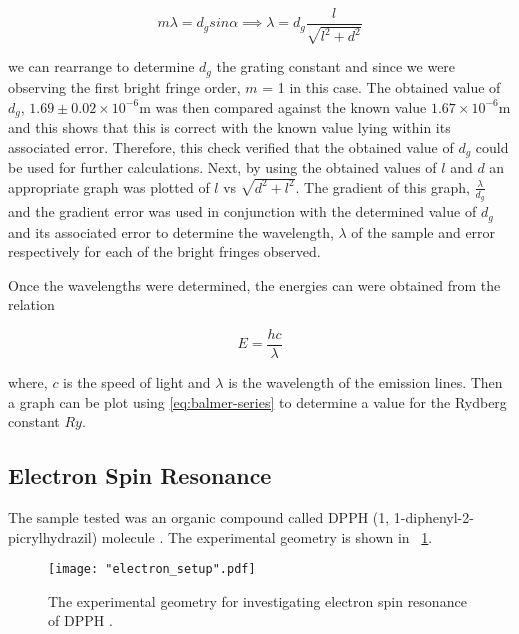 \documentclass{article}
\newcommand{\figref}[2][\figurename~]{#1\ref{#2}}
\begin{document}
\begin{equation}
\label{eq:grating-equation}
m\lambda = d_gsin\alpha \implies \lambda = d_g\frac{l}{\sqrt{l^2+d^2}}
\end{equation}

\vspace{2mm}
\noindent
we can rearrange to determine $d_g$ the grating constant and since we were observing the first bright fringe order, $m$ = 1 in this case. The obtained value of $d_g$, $1.69 \pm 0.02 \times 10^{-6}$m was then compared against the known value $1.67 \times 10 ^{-6}$m \cite{Paper01} and this shows that this is correct with the known value lying within its associated error. Therefore, this check verified that the obtained value of $d_g$ could be used for further calculations. Next, by using the obtained values of $l$ and $d$ an appropriate graph was plotted of $l$ vs $\sqrt{d^2 + l^2}$. The gradient of this graph, $\frac{\lambda}{d_g}$ and the gradient error was used in conjunction with the determined value of $d_g$ and its associated error to determine the wavelength, $\lambda$ of the sample and error respectively for each of the bright fringes observed.

\vspace{2mm}
\noindent
Once the wavelengths were determined, the energies can were obtained from the relation 

\begin{equation}
\label{eq:energy-wavelength}
E = \frac{hc}{\lambda}
\end{equation}

\vspace{2mm}
\noindent
where, $c$ is the speed of light and $\lambda$ is the wavelength of the emission lines. Then a graph can be plot using \eqref{eq:balmer-series} to determine a value for the Rydberg constant $Ry$.

\subsection{Electron Spin Resonance}
\label{ssec:electron-method}

The sample tested was an organic compound called DPPH (1, 1-diphenyl-2-picrylhydrazil) molecule \cite{Paper02}. The experimental geometry is shown in \figref{fig:electron_setup}. 

\begin{figure}[h]
\centering
\texttt{[image: "electron\_setup".pdf]}
\caption{The experimental geometry for investigating electron spin resonance of DPPH \cite{Paper02}.}
\label{fig:electron_setup}
\end{figure}
\end{document}
